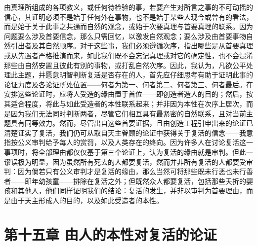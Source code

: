 由真理所组成的各项教义，或任何待检验的事，若要产生对所言之事的不可动摇的信心，其证明必须不是始于任何外在事物，也不是始于某些人现今或曾有的看法，而是始于关于此事之共通而自然的观念，或始于次要真理与首要真理的联系。因为问题要么涉及首要信念，那么只需回忆，以激发自然观念；要么涉及由首要事物自然引出者及其自然顺序。对于这些事，我们必须遵循次序，指出哪些是从首要真理或从先置者严格推演而来，如此我们既不会忘记真理或对它的确定性，也不会混淆那些由自然安置且彼此有别的事物，或打乱自然次序。因此，我认为，凡欲公平处理此主题，并愿意明智判断复活是否存在的人，首先应仔细思考有助于证明此事的论证力度及各论证所处位置——何者为第一、何者第二、何者第三、何者最后。在安排这些论证时，应将人受造的缘由置于首位——即创造者造人的目的；然后，按其适合程度，将此与如此受造者的本性联系起来；并非因为本性在次序上居次，而是因为我们无法同时判断两者，尽管它们相互具有最紧密的自然联系，且对当前主题具有同等效力。然而，尽管出自这些首要证据，且由创造工程引申出来的论证已清楚证实了复活，我们仍可从取自天主眷顾的论证中获得关于复活的信念——我意指按公义审判给予每人的赏罚，以及人类存在的终向。因为许多人在讨论复活这一事项时，将全部理由都仅仅基于第三个论证上，认为复活的缘由就是审判。但此一谬误极为明显，因为虽然所有死去的人都要复活，然而并非所有复活的人都要受审判：因为倘若只有公义审判才是复活的缘由，那么当然可将那些既未行恶也未行善者——即年幼孩童——排除在复活之外；但既然众人都要复活，包括那些夭折的婴孩和其他人，他们同样证明我们的结论：复活的发生，并非以审判为首要理由，而是由于天主形成人的目的，以及如此受造者的本性。\par


\section{第十五章 由人的本性对复活的论证}

